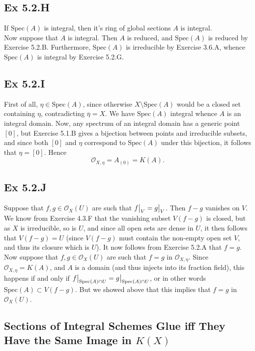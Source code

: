 \documentclass{article}
\newcommand\restr[2]{{%
  \left.\kern-\nulldelimiterspace %
  #1 %
  \vphantom{\big|} %
  \right|_{#2} %
  }}
\theoremstyle{definition}
\newcommand{\oo}{\mathcal{O}}
\newcommand{\ox}{\mathcal{O}_X}
\newcommand{\Spec}{\text{Spec}}
\begin{document}
\subsection*{Ex 5.2.H}

If $\Spec(A)$ is integral, then it's ring of global sections $A$ is integral. \\

Now suppose that $A$ is integral. Then $A$ is reduced, and $\Spec(A)$ is
reduced by Exercise 5.2.B. Furthermore, $\Spec(A)$ is irreducible by Exercise
3.6.A, whence $\Spec(A)$ is integral by Exercise 5.2.G.

\subsection*{Ex 5.2.I}

First of all, $\eta \in \Spec(A)$, since otherwise $X \setminus \Spec(A)$ would
be a closed set containing $\eta$, contradicting $\overline{\eta} = X$. We have
$\Spec(A)$ integral whence $A$ is an integral domain. Now, any spectrum of an
integral domain has a generic point $[0]$, but Exercise 5.1.B gives a bijection
between points and irreducible subsets, and since both $[0]$ and $\eta$
correspond to $\Spec(A)$ under this bijection, it follows that $\eta = [0]$.
Hence 
\[
	\oo_{X, \eta}
	=
	A_{(0)}
	=
	K(A).
\] 

\subsection*{Ex 5.2.J}

Suppose that $f, g \in \ox(U)$ are such that $\restr{f}{V} = \restr{g}{V}$.
Then $f - g$ vanishes on $V$. We know from Exercise 4.3.F that the vanishing
subset $V(f - g)$ is closed, but as $X$ is irreducible, so is $U$, and since
all open sets are dense in $U$, it then follows that $V(f - g) = U$ (since $V(f
- g)$ must contain the non-empty open set $V$, and thus its closure which is
$U$). It now follows from Exercise 5.2.A that $f = g$. \\

Now suppose that $f, g \in \ox(U)$ are such that $f = g$ in $\oo_{X, \eta}$.
Since $\oo_{X, \eta} = K(A)$, and $A$ is a domain (and thus injects into its
fraction field), this happens if and only if $\restr{f}{\Spec(A) \cap U} =
\restr{g}{\Spec(A) \cap U}$, or in other words $\Spec(A) \subset V(f - g)$. But
we showed above that this implies that $f = g$ in $\ox(U)$.

\subsection*{Sections of Integral Schemes Glue iff They Have the Same Image in $K(X)$}
\end{document}
